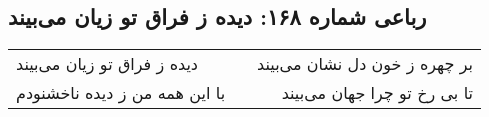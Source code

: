 \begin{center}
\section*{رباعی شماره ۱۶۸: دیده ز فراق تو زیان می‌بیند}
\label{sec:sh168}
\begin{longtable}{l p{0.5cm} r}
دیده ز فراق تو زیان می‌بیند
&&
بر چهره ز خون دل نشان می‌بیند
\\
با این همه من ز دیده ناخشنودم
&&
تا بی رخ تو چرا جهان می‌بیند
\\
\end{longtable}
\end{center}
